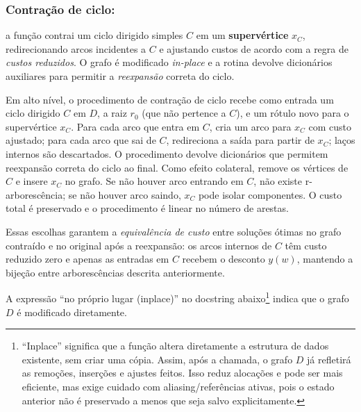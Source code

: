 \subsubsection{Contração de ciclo:}
a função contrai um ciclo dirigido simples \(C\) em um \textbf{supervértice} \(x_C\), redirecionando arcos incidentes a \(C\) e ajustando custos de acordo com a regra de \emph{custos reduzidos}. O grafo é modificado \emph{in-place} e a rotina devolve dicionários auxiliares para permitir a \emph{reexpansão} correta do ciclo.

Em alto nível, o procedimento de contração de ciclo recebe como entrada um ciclo dirigido $C$ em $D$, a raiz $r_0$ (que não pertence a $C$), e um rótulo novo para o supervértice $x_C$. Para cada arco que entra em $C$, cria um arco para $x_C$ com custo ajustado; para cada arco que sai de $C$, redireciona a saída para partir de $x_C$; laços internos são descartados. O procedimento devolve dicionários que permitem reexpansão correta do ciclo ao final. Como efeito colateral, remove os vértices de $C$ e insere $x_C$ no grafo. Se não houver arco entrando em $C$, não existe r-arborescência; se não houver arco saindo, $x_C$ pode isolar componentes. O custo total é preservado e o procedimento é linear no número de arestas.

Essas escolhas garantem a \emph{equivalência de custo} entre soluções ótimas no grafo contraído e no original após a reexpansão: os arcos internos de \(C\) têm custo reduzido zero e apenas as entradas em \(C\) recebem o desconto \(y(w)\), mantendo a bijeção entre arborescências descrita anteriormente.


\noindent A expressão “no próprio lugar (in\-place)” no docstring abaixo\footnote{“In\-place” significa que a função altera diretamente a estrutura de dados existente, sem criar uma cópia. Assim, após a chamada, o grafo \(D\) já refletirá as remoções, inserções e ajustes feitos. Isso reduz alocações e pode ser mais eficiente, mas exige cuidado com aliasing/referências ativas, pois o estado anterior não é preservado a menos que seja salvo explicitamente.} indica que o grafo \(D\) é modificado diretamente.

